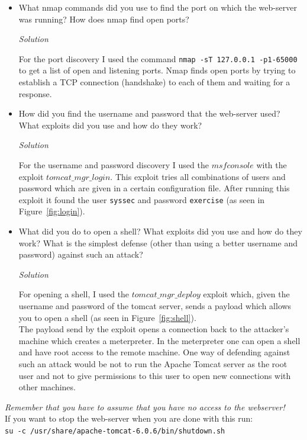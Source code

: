 \documentclass[a4paper,11pt]{article}
\newenvironment{solution}%
{\par\begin{minipage}{\linewidth}{\noindent\small\textit{Solution}\\}\begin{boxedminipage}{\linewidth}}%
{\end{boxedminipage}\end{minipage}\par\bigskip}
\begin{document}
\begin{itemize}
\item What nmap commands did you use to find the port on which the
  web-server was running? How does nmap find open ports?
\ifsolution\begin{solution}
For the port discovery I used the command \texttt{nmap -sT 127.0.0.1 -p1-65000} to get
a list of open and listening ports. Nmap finds open ports by trying to establish
a TCP connection (handshake) to each of them and waiting for a response.
\end{solution}\fi
\item How did you find the username and password that the web-server
  used? What exploits did you use and how do they work?
  \ifsolution\begin{solution}
For the username and password discovery I used the $msfconsole$ with the exploit
$tomcat\_mgr\_login$. This exploit tries all combinations of users and password which
are given in a certain configuration file. After running this exploit it found the user
\texttt{syssec} and password \texttt{exercise} (as seen in Figure~\ref{fig:login}).

\end{solution}\fi

\item What did you do to open a shell? What
  exploits did you use and how do they work? What is
  the simplest defense (other than using a better username and
  password) against such an attack?
  \ifsolution\begin{solution}
For opening a shell, I used the $tomcat\_mgr\_deploy$ exploit which, given the
username and password of the tomcat server, sends a payload which allows you to
open a shell (as seen in Figure~\ref{fig:shell}).\\
The payload send by the exploit opens a connection back to the attacker's machine
which creates a meterpreter. In the meterpreter one can open a shell and have root access
to the remote machine. One way of defending against such an attack would be not to run
the Apache Tomcat server as the root user and not to give permissions to this user
to open new connections with other machines.
\end{solution}\fi
 \end{itemize}
 \textit{Remember that you have to assume that you have no access to
   the webserver!}\\
  If you want to stop the web-server when you are done with this run:\\
 \verb|su -c /usr/share/apache-tomcat-6.0.6/bin/shutdown.sh|
 
\end{document}
